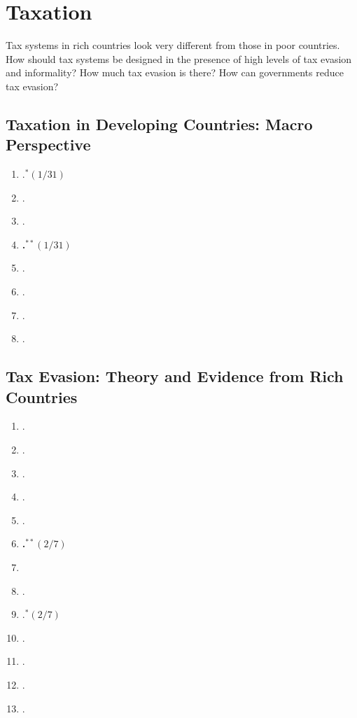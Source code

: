 \documentclass[11pt]{article}
\begin{document}
\section{Taxation}
Tax systems in rich countries look very different from those in poor countries. How should tax systems be designed in the presence of high levels of tax evasion and informality? How much tax evasion is there? How can governments reduce tax evasion?

\subsection{Taxation in Developing Countries: Macro Perspective}

\begin{enumerate}
\item {}.$^{*}(1/31)$
\item {}.
\item {}.
\item \textbf{.$^{**}(1/31)$}
\item {}.
\item {}.
\item {}.
\item {}.
\end{enumerate}

\subsection{Tax Evasion: Theory and Evidence from Rich Countries}

\begin{enumerate}
\item {}.
\item {}.
\item {}.
\item {}.
\item {}.
\item \textbf{.$^{**}(2/7)$}
\item {}
\item {}.
\item {}.$^{*}(2/7)$
\item {}.
\item {}.
\item {}.
\item {}.
\end{enumerate}
\end{document}
